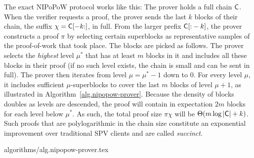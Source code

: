 The exact NIPoPoW protocol works like this: The prover holds a full chain
$\mathsf{C}$. When the verifier requests a proof, the prover sends the last $k$
blocks of their chain, the suffix $\chi = \mathsf{C}[-k{:}]$, in full. From the
larger prefix $\mathsf{C}[{:}-k]$, the prover constructs a proof $\pi$ by selecting
certain superblocks as representative samples of the proof-of-work that took
place. The blocks are picked as follows. The prover selects the \emph{highest}
level $\mu^*$ that has at least $m$ blocks in it and includes all these blocks
in their proof (if no such level exists, the chain is small and can be sent in
full). The prover then iterates from level $\mu = \mu^* - 1$ down to $0$. For
every level $\mu$, it includes sufficient $\mu$-superblocks to cover the last
$m$ blocks of level $\mu + 1$, as illustrated in
Algorithm~\ref{alg.nipopow-prover}. Because the density of blocks doubles as
levels are descended, the proof will contain in expectation $2m$ blocks for each
level below $\mu^*$. As such, the total proof size $\pi \chi$ will be
$\Theta(m\log|\mathsf{C}| + k)$. Such proofs that are polylogarithmic in the chain
size constitute an exponential improvement over traditional SPV clients and are
called \emph{succinct}.

{algorithms/alg.nipopow-prover.tex}

